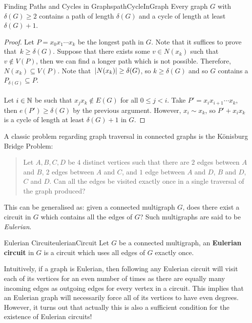 \documentclass[math, code]{amznotes}
\theoremstyle{remark}
\begin{document}
\begin{probox}{Finding Paths and Cycles in Graphs}{pathCycleInGraph}
    Every graph $G$ with $\delta(G) \geq 2$ contains a path of length $\delta(G)$ and a cycle of length at least $\delta(G) + 1$.
    \tcblower
    \begin{proof}
        Let $P = x_0x_1\cdots x_k$ be the longest path in $G$. Note that it suffices to prove that~$k \geq \delta(G)$. Suppose that there exists some $v \in N(x_k)$ such that $v \notin V(P)$, then we can find a longer path which is not possible. Therefore, $N(x_k) \subseteq V(P)$. Note that~${\left\lvert {N(x_k)} \right\rvert} \geq \delta(G)$, so $k \geq \delta(G)$ and so $G$ contains a $P_{\delta(G)} \subseteq P$.
        \\\\
        Let $i \in \mathbb{N}$ be such that $x_jx_k \notin E(G)$ for all $0 \leq j < i$. Take $P' = x_ix_{i + 1}\cdots x_k$, then $e(P') \geq \delta(G)$ by the previous argument. However, $x_i \sim x_k$, so $P' + x_ix_k$ is a cycle of length at least $\delta(G) + 1$ in $G$.
    \end{proof}
\end{probox}
A classic problem regarding graph traversal in connected graphs is the K\"{o}nisburg Bridge Problem:
\begin{quote}
    Let $A, B, C, D$ be $4$ distinct vertices such that there are $2$ edges between $A$ and $B$, $2$ edges between $A$ and $C$, and $1$ edge between $A$ and $D$, $B$ and $D$, $C$ and $D$. Can all the edges be visited exactly once in a single traversal of the graph produced?
\end{quote}
This can be generalised as: given a connected multigraph $G$, does there exist a circuit in $G$ which contains all the edges of $G$? Such multigraphs are said to be \textit{Eulerian}.
\begin{dfnbox}{Eulerian Circuit}{eulerianCircuit}
    Let $G$ be a connected multigraph, an {\color{red} \textbf{Eulerian circuit}} in $G$ is a circuit which uses all edges of $G$ exactly once.
\end{dfnbox}
Intuitively, if a graph is Eulerian, then following any Eulerian circuit will visit each of its vertices for an even number of times as there are equally many incoming edges as outgoing edges for every vertex in a circuit. This implies that an Eulerian graph will necessarily force all of its vertices to have even degrees. However, it turns out that actually this is also a sufficient condition for the existence of Eulerian circuits!
\end{document}
